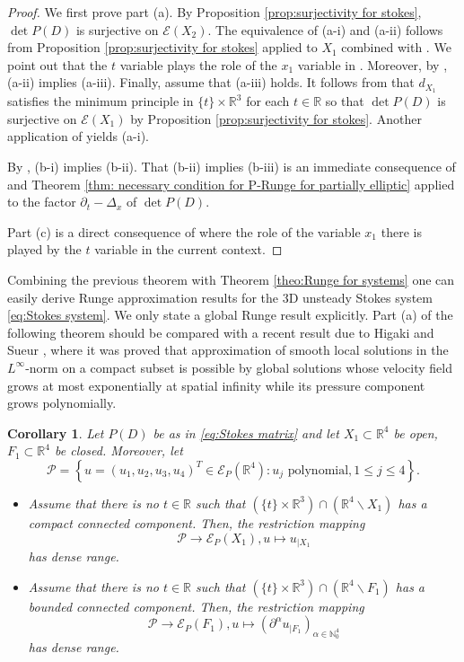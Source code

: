 \documentclass[a4paper,10pt]{amsart}
\newtheorem{corollary}[theorem]{Corollary}
\newtheorem*{crucial lemma}{Lemma \ref{lem:nice polynomial2}}
\theoremstyle{definition}
\newcommand{\R}{\mathbb{R}}
\newcommand{\N}{\mathbb{N}}
\newcommand{\detP}{\operatorname{det}\!P}
\begin{document}
\begin{proof}
	We first prove part (a). By Proposition \ref{prop:surjectivity for stokes}, $\detP(D)$ is surjective on $\mathscr{E}(X_2)$. The equivalence of (a-i) and (a-ii) follows from Proposition \ref{prop:surjectivity for stokes} applied to $X_1$ combined with \cite[Theorem 6]{Kalmes2021}. We point out that the $t$ variable plays the role of the $x_1$ variable in \cite{Kalmes2021}. Moreover, by \cite[Theorem Theorem 1]{Kalmes2021}, (a-ii) implies (a-iii). Finally, assume that (a-iii) holds. It follows from \cite[Lemma 3.2]{DebKalmes2024} that $d_{X_1}$ satisfies the minimum principle in $\{t\}\times\R^3$ for each $t\in\R$ so that $\detP(D)$ is surjective on $\mathscr{E}(X_1)$ by Proposition \ref{prop:surjectivity for stokes}. Another application of \cite[Theorem 1]{Kalmes2021} yields (a-i). 
 	
	By \cite[Theorem 16]{CiasKalmes2025}, (b-i) implies (b-ii). That (b-ii) implies (b-iii) is an immediate consequence of \cite[Corollary 8]{CiasKalmes2025} and Theorem \ref{thm: necessary condition for P-Runge for partially elliptic} applied to the factor $\partial_t-\Delta_x$ of $\detP(D)$.
	
	Part (c) is a direct consequence of \cite[Theorem B]{CiasKalmes2025} where the role of the variable $x_1$ there is played by the $t$ variable in the current context.
\end{proof}

Combining the previous theorem with Theorem \ref{theo:Runge for systems} one can easily derive Runge approximation results for the 3D unsteady Stokes system \eqref{eq:Stokes system}. We only state a global Runge result explicitly. Part (a) of the following theorem should be compared with a recent result due to Higaki and Sueur \cite{HiSu25}, where it was proved that approximation of smooth local solutions in the $L^\infty$-norm on a compact subset is possible by global solutions whose velocity field grows at most exponentially at spatial infinity while its pressure component grows polynomially.

\begin{corollary}\label{cor:global Runge for 3D unsteady Stokes}
	Let $P(D)$ be as in \eqref{eq:Stokes matrix} and let $X_1\subset\R^4$ be open, $F_1\subset \R^4$ be closed. Moreover, let
	\[\mathcal{P}=\left\{u=(u_1,u_2,u_3,u_4)^T\in\mathscr{E}_P(\R^4)\colon u_j\mbox{ polynomial}, 1\leq j\leq 4\right\}.\]
	\begin{itemize}
		\item[(a)] Assume that there is no $t\in\R$ such that $(\{t\}\times\R^3)\cap (\R^4\backslash X_1)$ has a compact connected component. Then, the restriction mapping
		\[\mathcal{P}\rightarrow \mathscr{E}_P(X_1), u\mapsto u_{|X_1}\]
		has dense range.
		\item[(b)] Assume that there is no $t\in\R$ such that $(\{t\}\times\R^3)\cap (\R^4\backslash F_1)$ has a bounded connected component. Then, the restriction mapping
		\[\mathcal{P}\rightarrow \mathscr{E}_P(F_1), u\mapsto \left(\partial^\alpha u_{|F_1}\right)_{\alpha\in\N_0^4}\]
		has dense range.
	\end{itemize}
\end{corollary}
\end{document}
